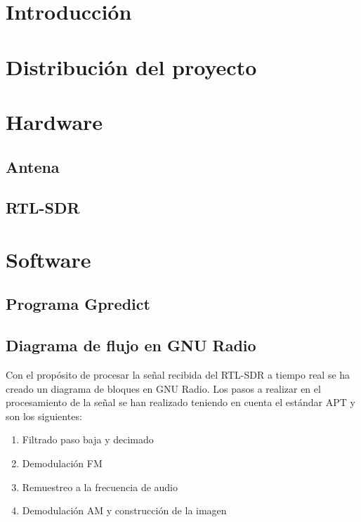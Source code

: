 \documentclass[a4paper,11pt]{article}
\begin{document}




\section{Introducción}

\section{Distribución del proyecto}


\section{Hardware}

	\subsection{Antena}
	\subsection{RTL-SDR}

\section{Software}

	\subsection{Programa Gpredict}

	\subsection{Diagrama de flujo en GNU Radio}
	Con el propósito de procesar la señal recibida del RTL-SDR a tiempo real se ha creado un diagrama de bloques en GNU Radio. Los pasos a realizar en el procesamiento de la señal se han realizado teniendo en cuenta el estándar APT y son los siguientes:
	\begin{enumerate}
	\item Filtrado paso baja y decimado
	\item Demodulación FM
	\item Remuestreo a la frecuencia de audio
	\item Demodulación AM y construcción de la imagen
	\end{enumerate}
	
\end{document}
